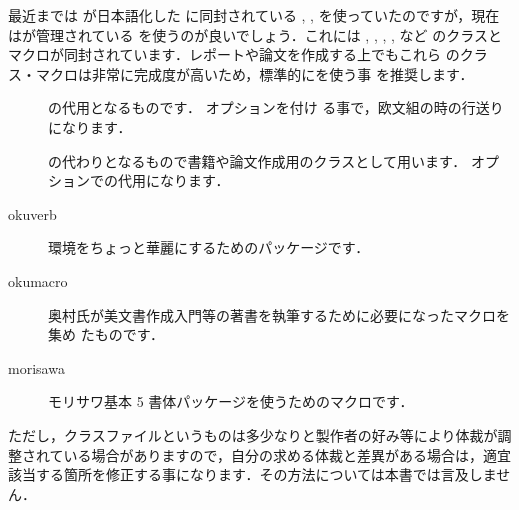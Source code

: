 最近までは  が日本語化した \pTeX に同封されている
, ,  を使っていたのですが，現在はが管理されている  を使うのが良いでしょう．これには
, , , ,  など
のクラスとマクロが同封されています．レポートや論文を作成する上でもこれら
のクラス・マクロは非常に完成度が高いため，標準的にを使う事
を推奨します．
\begin{description}
 \item[] 
   の代用となるものです． オプションを付け
  る事で，欧文組の時の行送りになります．
 \item[]
   の代わりとなるもので書籍や論文作成用のクラスとして用います．
   オプションでの代用になります．
 \item[okuverb]
   環境をちょっと華麗にするためのパッケージです．
 \item[okumacro]
  奥村氏が美文書作成入門等の著書を執筆するために必要になったマクロを集め
  たものです．
 \item[morisawa]
  モリサワ基本 5 書体パッケージを使うためのマクロです．
\end{description}
ただし，クラスファイルというものは多少なりと製作者の好み等により体裁が調
整されている場合がありますので，自分の求める体裁と差異がある場合は，適宜
該当する箇所を修正する事になります．その方法については本書では言及しませ
ん．

